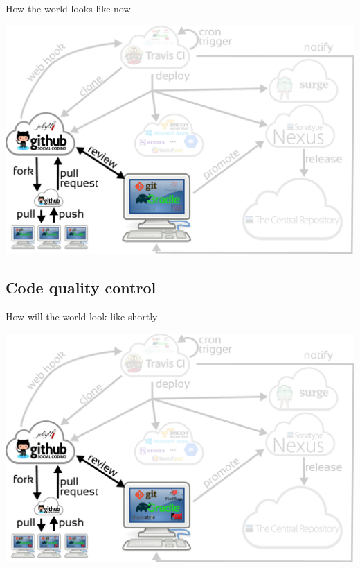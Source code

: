 \documentclass[presentation]{beamer}
\begin{document}
\begin{frame}[fragile]{How the world looks like now}
	\begin{center}
		\includegraphics[width=.9\textwidth]{images/ci-gradle}
	\end{center}
\end{frame}

\subsection{Code quality control}

\begin{frame}[fragile]{How will the world look like shortly}
	\begin{center}
		\includegraphics[width=.9\textwidth]{images/ci-codequality}
	\end{center}
\end{frame}
\end{document}
